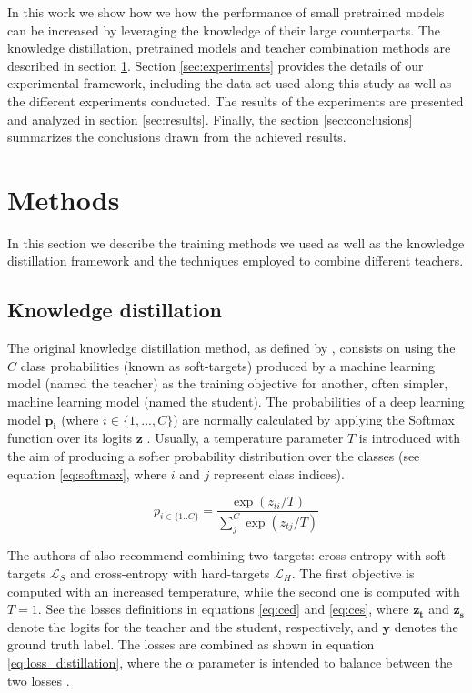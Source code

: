 \documentclass{elsarticle}
\begin{document}
	In this work we show how we how the performance of small pretrained models can be increased by leveraging the knowledge of their large counterparts. The knowledge distillation, pretrained models and teacher combination methods are described in section  \ref{sec:methods}. Section \ref{sec:experiments} provides the details of our experimental framework, including the data set used along this study as well as the different experiments conducted. The results of the experiments are presented and analyzed in section \ref{sec:results}. Finally, the section \ref{sec:conclusions} summarizes the conclusions drawn from the achieved results.
	
	\section{Methods} \label{sec:methods}
	In this section we describe the training methods we used as well as the knowledge distillation framework and the techniques employed to combine different teachers.
	
	\subsection{Knowledge distillation} \label{sec:kd}
	The original knowledge distillation method, as defined by \citep{hinton2015}, consists on using the $C$ class probabilities (known as soft-targets) produced by a machine learning model (named the teacher) as the training objective for another, often simpler, machine learning model (named the student). The probabilities of a deep learning model $\mathbf{p_i}$ (where $i \in \{1,...,C\}$) are normally calculated by applying the Softmax function over its logits $\mathbf{z}$ \citep{goodfellow2016}. Usually, a temperature parameter $T$ is introduced with the aim of producing a softer probability distribution over the classes (see equation \ref{eq:softmax}, where $i$ and $j$ represent class indices).
	
	\begin{equation}
	p_{i \in \{1 .. C\}} = \frac{\exp(z_{ti}/T)}{\sum_j^C \exp(z_{tj}/T)}
	\label{eq:softmax}
	\end{equation}
	
	The authors of \citep{hinton2015} also recommend combining two targets: cross-entropy with soft-targets $\mathcal{L}_S$ and cross-entropy with hard-targets  $\mathcal{L}_H$. The first objective is computed with an increased temperature, while the second one is computed with $T=1$. See the losses definitions in equations \ref{eq:ced} and \ref{eq:ces}, where $\mathbf{z_t}$ and $\mathbf{z_s}$ denote the logits for the teacher and the student, respectively, and $\mathbf{y}$ denotes the ground truth label. The losses are combined as shown in equation \ref{eq:loss_distillation}, where the $\alpha$ parameter is intended to balance between the two losses \citep{gou2020}.
	
\end{document}
